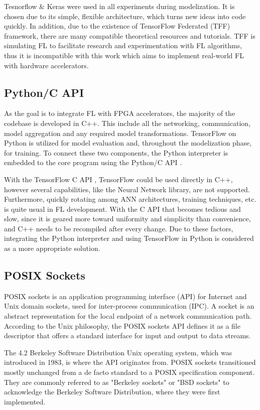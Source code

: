 Tesnorflow \& Keras were used in all experiments during modelization. It is chosen due to its simple, flexible architecture, which turns new ideas into code quickly. In addition, due to the existence of TensorFlow Federated (TFF) \cite{tff} framework, there are many compatible theoretical resources and tutorials. TFF is simulating FL to facilitate research and experimentation with FL algorithms, thus it is incompatible with this work which aims to implement real-world FL with hardware accelerators.

\subsection{Python/C API} \label{Python/C API}
As the goal is to integrate FL with FPGA accelerators, the majority of the codebase is developed in C++. This include all the networking, communication, model aggregation and any required model transformations. TensorFlow on Python is utilized for model evaluation and, throughout the modelization phase, for training. To connect these two components, the Python interpreter is embedded to the core program using the Python/C API \cite{Python/C_API, embedding_python}.

With the TensorFlow C API \cite{TF_C_API}, TensorFlow could be used directly in C++, however several capabilities, like the Neural Network library, are not supported. Furthermore, quickly rotating among ANN architectures, training techniques, etc. is quite usual in FL development. With the C API that becomes tedious and slow, since it is geared more toward uniformity and simplicity than convenience, and C++ needs to be recompiled after every change. Due to these factors, integrating the Python interpreter and using TensorFlow in Python is considered as a more appropriate solution.

\subsection{POSIX Sockets}
POSIX sockets \cite{POSIX_socket} is an application programming interface (API) for Internet and Unix domain sockets, used for inter-process communication (IPC). A socket is an abstract representation for the local endpoint of a network communication path. According to the Unix philosophy, the POSIX sockets API defines it as a file descriptor that offers a standard interface for input and output to data streams.

The 4.2 Berkeley Software Distribution \cite{bsd} Unix operating system, which was introduced in 1983, is where the API originates from. POSIX sockets transitioned mostly unchanged from a de facto standard to a POSIX specification component. They are commonly referred to as "Berkeley sockets" or "BSD sockets" to acknowledge the Berkeley Software Distribution, where they were first implemented.
 
